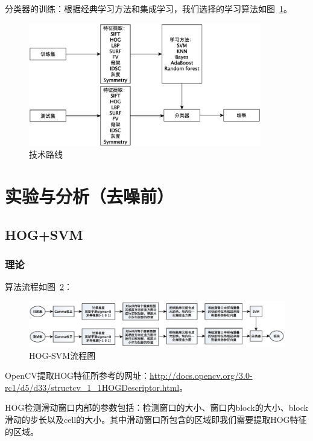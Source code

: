 \documentclass[12pt]{article}
\begin{document}
分类器的训练：根据经典学习方法和集成学习，我们选择的学习算法如图~\ref{fig:TechnicalRoute}。

    \begin{figure}[!ht]
    \centering
    \includegraphics[width=4in]{TechnicalRoute}
    \caption{技术路线}
    \label{fig:TechnicalRoute}
    \end{figure}

\section{实验与分析（去噪前）}

\subsection{HOG+SVM}

\subsubsection{理论}

算法流程如图~\ref{fig: HOG-flowchart}：

\begin{figure}[!ht]
\centering
\includegraphics[width=1.0\linewidth]{HOG-flowchart.eps}
\caption{HOG-SVM流程图}
\label{fig: HOG-flowchart}
\end{figure}

OpenCV提取HOG特征所参考的网址：\url{http://docs.opencv.org/3.0-rc1/d5/d33/structcv_1_1HOGDescriptor.html}。

HOG检测滑动窗口内部的参数包括：检测窗口的大小、窗口内block的大小、block滑动的步长以及cell的大小。其中滑动窗口所包含的区域即我们需要提取HOG特征的区域。
\end{document}
